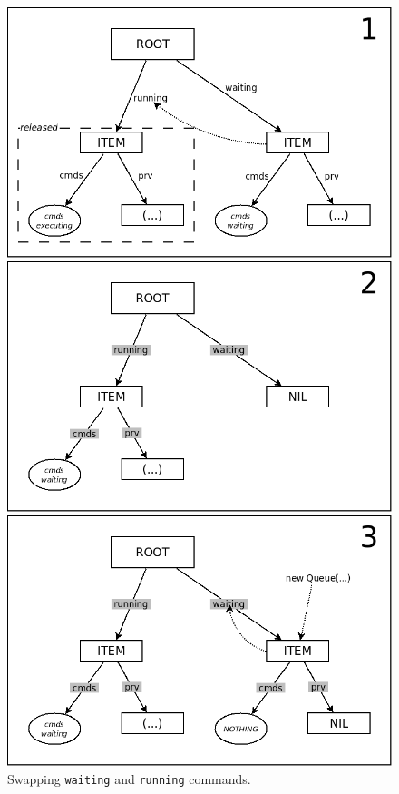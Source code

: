 \documentclass{acm_proc_article-sp}
\newcommand{\code}[1] {{\small{\texttt{#1}}}}
\begin{document}
\begin{figure}%
\begin{minipage}[t]{0.33\linewidth}
\centering
\includegraphics[scale=0.20]{queue-21.png}
\end{minipage}
\begin{minipage}[t]{0.33\linewidth}
\centering
\includegraphics[scale=0.20]{queue-22.png}
\end{minipage}
\begin{minipage}[t]{0.33\linewidth}
\centering
\includegraphics[scale=0.20]{queue-23.png}
\end{minipage}
\caption{
Swapping \code{waiting} and \code{running} commands.
\label{fig.queue-2}
}
\end{figure}
\end{document}
